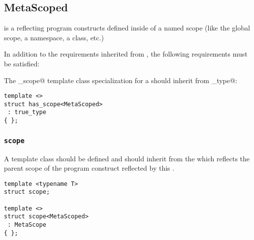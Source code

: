 \subsection{MetaScoped}
\label{concept-MetaScoped}


 is a  reflecting program constructs defined inside
of a named scope (like the global scope, a namespace, a class, etc.)

In addition to the requirements inherited from , the following requirements must
be satisfied:

The \verb@has_scope@ template class specialization for a  should
inherit from \verb@true_type@:

\begin{lstlisting}
template <>
struct has_scope<MetaScoped>
 : true_type
{ };
\end{lstlisting}

\subsubsection{\texttt{scope}}

A template class \verb@scope@ should be defined and should inherit from the
 which reflects the parent scope of the program construct reflected
by this .

\begin{lstlisting}
template <typename T>
struct scope;

template <>
struct scope<MetaScoped>
 : MetaScope
{ };
\end{lstlisting}

